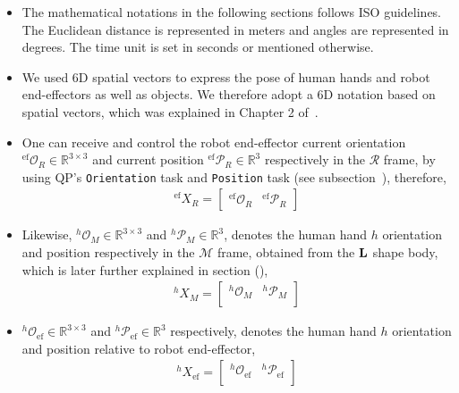 \begin{itemize}
	\item The mathematical notations in the following sections follows ISO guidelines. The Euclidean distance is represented in meters and angles are represented in degrees. The time unit is set in seconds or mentioned otherwise.
	
	\item We used 6D spatial vectors to express the pose of human hands and robot end-effectors as well as objects. We therefore adopt a 6D notation based on spatial vectors, which was explained in Chapter 2 of~\cite{featherstone2014rigid}.
	
	\item One can receive and control the robot end-effector current orientation ${{}^{\text{ef}}\mathcal{O}_R} \in \mathbb{R}^{3\times3}$ and current position ${{}^{\text{ef}}\mathcal{P}_R} \in \mathbb{R}^{3}$ respectively in the $\mathcal{R}$ frame, by using QP's \texttt{Orientation} task and \texttt{Position} task (see subsection~), therefore,
	\begin{gather}\label{X_R_ef}
	{}^{\text{ef}}{X}_R =
	\left[\begin{array}{cc}
	{}^{\text{ef}}\mathcal{O}_R & {}^{\text{ef}}\mathcal{P}_R
	\end{array}\right]
	\end{gather}
	
	\item Likewise, ${{}^{h}\mathcal{O}_M} \in \mathbb{R}^{3\times3}$ and ${{}^{h}\mathcal{P}_M} \in \mathbb{R}^{3}$, denotes the human hand $h$ orientation and position respectively in the $\mathcal{M}$ frame, obtained from the ${\bf L}$ shape body, which is later further explained in section (),
	\begin{gather}\label{X_M_h}
	{}^{h}{X}_M =
	\left[\begin{array}{cc}
	{}^{h}\mathcal{O}_M & {}^{h}\mathcal{P}_M \\
	\end{array}\right]
	\end{gather}
	
	\item ${{}^{h}\mathcal{O}_{\text{ef}}} \in \mathbb{R}^{3\times3}$ and ${{}^{h}\mathcal{P}_{\text{ef}}} \in \mathbb{R}^{3}$ respectively, denotes the human hand $h$ orientation and position relative to robot end-effector,
	\begin{gather}\label{X_ef_h}
	{}^{h}{X}_{\text{ef}} =
	\left[\begin{array}{cc}
	{}^{h}\mathcal{O}_{\text{ef}} & {}^{h}\mathcal{P}_{\text{ef}} \\
	\end{array}\right]
	\end{gather}
	

\end{itemize}

